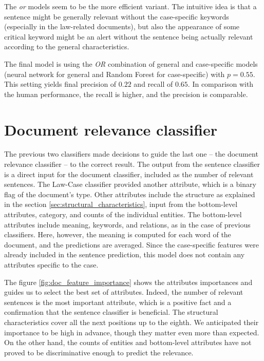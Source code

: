 \documentclass[
  digital, %
  notable,   %
  nolof,     %
  nolot,     %
]{fithesis3}
\begin{document}
The \textit{or} models seem to be the more efficient variant.
The intuitive idea is that a sentence might be generally relevant without the case-specific keywords (especially in the law-related documents), but also the appearance of some critical keyword might be an alert without the sentence being actually relevant according to the general characteristics.

The final model is using the \textit{OR} combination of general and case-specific models (neural network for general and Random Forest for case-specific) with $p=0.55$.
This setting yields final precision of $0.22$ and recall of $0.65$.
In comparison with the human performance, the recall is higher, and the precision is comparable.

\section{Document relevance classifier}
\label{sec:document-classifier}
The previous two classifiers made decisions to guide the last one -- the document relevance classifier -- to the correct result.
The output from the sentence classifier is a direct input for the document classifier, included as the number of relevant sentences.
The Law-Case classifier provided another attribute, which is a binary flag of the document's type.
Other attributes include the structure as explained in the section \ref{sec:structural_characteristics}, input from the bottom-level attributes, category, and counts of the individual entities.
The bottom-level attributes include meaning, keywords, and relations, as in the case of previous classifiers.
Here, however, the meaning is computed for each word of the document, and the predictions are averaged.
Since the case-specific features were already included in the sentence prediction, this model does not contain any attributes specific to the case.

The figure \ref{fig:doc_feature_importance} shows the attributes importances and guides us to select the best set of attributes.
Indeed, the number of relevant sentences is the most important attribute, which is a positive fact and a confirmation that the sentence classifier is beneficial.
The structural characteristics cover all the next positions up to the eighth.
We anticipated their importance to be high in advance, though they matter even more than expected.
On the other hand, the counts of entities and bottom-level attributes have not proved to be discriminative enough to predict the relevance.
\end{document}
